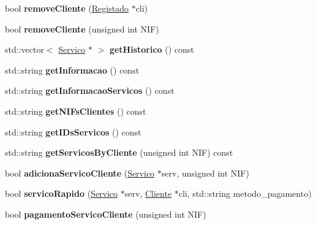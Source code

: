 \begin{DoxyCompactItemize}
bool {\bfseries remove\+Cliente} (\hyperlink{class_registado}{Registado} $\ast$cli)
\item 
\hypertarget{class_empresa_ad92331511c58763afed45f668421454c}{}\label{class_empresa_ad92331511c58763afed45f668421454c} 
bool {\bfseries remove\+Cliente} (unsigned int N\+IF)
\item 
\hypertarget{class_empresa_a1f97b7763f0d4977192713a6350d45c4}{}\label{class_empresa_a1f97b7763f0d4977192713a6350d45c4} 
std\+::vector$<$ \hyperlink{class_servico}{Servico} $\ast$ $>$ {\bfseries get\+Historico} () const
\item 
\hypertarget{class_empresa_a31c9add956cf208592c82e600389ebec}{}\label{class_empresa_a31c9add956cf208592c82e600389ebec} 
std\+::string {\bfseries get\+Informacao} () const
\item 
\hypertarget{class_empresa_a3a0b6dad40b7f05fede47be28dfc024d}{}\label{class_empresa_a3a0b6dad40b7f05fede47be28dfc024d} 
std\+::string {\bfseries get\+Informacao\+Servicos} () const
\item 
\hypertarget{class_empresa_a670edd3a8103ef4136a5d59054018278}{}\label{class_empresa_a670edd3a8103ef4136a5d59054018278} 
std\+::string {\bfseries get\+N\+I\+Fs\+Clientes} () const
\item 
\hypertarget{class_empresa_a601351adee76c9258438f841a41c5eaa}{}\label{class_empresa_a601351adee76c9258438f841a41c5eaa} 
std\+::string {\bfseries get\+I\+Ds\+Servicos} () const
\item 
\hypertarget{class_empresa_af40fde81230d4c58c678c3bfb6b1b35b}{}\label{class_empresa_af40fde81230d4c58c678c3bfb6b1b35b} 
std\+::string {\bfseries get\+Servicos\+By\+Cliente} (unsigned int N\+IF) const
\item 
\hypertarget{class_empresa_ae7e7f8be439aa63d7c6b174818260e32}{}\label{class_empresa_ae7e7f8be439aa63d7c6b174818260e32} 
bool {\bfseries adiciona\+Servico\+Cliente} (\hyperlink{class_servico}{Servico} $\ast$serv, unsigned int N\+IF)
\item 
\hypertarget{class_empresa_a17638d7cbc03ab5f6e0a4a57bb99ca56}{}\label{class_empresa_a17638d7cbc03ab5f6e0a4a57bb99ca56} 
bool {\bfseries servico\+Rapido} (\hyperlink{class_servico}{Servico} $\ast$serv, \hyperlink{class_cliente}{Cliente} $\ast$cli, std\+::string metodo\+\_\+pagamento)
\item 
\hypertarget{class_empresa_a1ea3f3759f3377ba18c974b21254c8e6}{}\label{class_empresa_a1ea3f3759f3377ba18c974b21254c8e6} 
bool {\bfseries pagamento\+Servico\+Cliente} (unsigned int N\+IF)
\end{DoxyCompactItemize}
